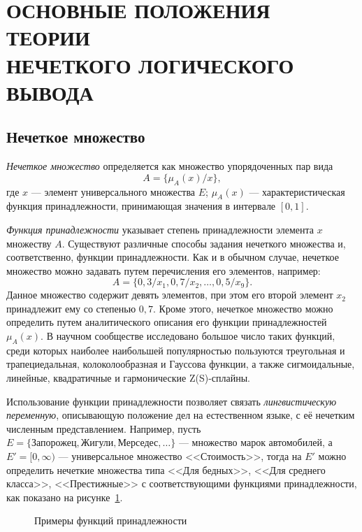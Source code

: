 \section[Основные положения теории нечеткого логического вывода]{%
  ОСНОВНЫЕ ПОЛОЖЕНИЯ ТЕОРИИ \\
  НЕЧЕТКОГО ЛОГИЧЕСКОГО ВЫВОДА
}

\subsection{Нечеткое множество}

\emph{Нечеткое множество} определяется как множество упорядоченных пар вида
\[
A = \{ \mu_A(x) / x \},
\]
где
\( x \) --- элемент универсального множества \( E \);
\( \mu_A(x) \) --- характеристическая функция принадлежности,
принимающая значения в интервале \( [0, 1] \).

\emph{Функция принадлежности} указывает степень принадлежности
элемента \( x \) множеству \( A \).
Существуют различные способы задания нечеткого множества и,
соответственно, функции принадлежности. Как и в обычном случае,
нечеткое множество можно задавать путем перечисления его элементов, например:
\[
  A = \{ 0{,}3/x_1, 0{,}7/x_2, \ldots, 0{,}5/x_9 \}.
\]
Данное множество содержит девять элементов, при этом его второй элемент \( x_2 \)
принадлежит ему со степенью \( 0{,}7 \).
Кроме этого, нечеткое множество можно определить путем аналитического описания его
функции принадлежностей \( \mu_A(x) \).
В научном сообществе исследовано большое число таких функций,
среди которых наиболее наибольшей популярностью пользуются
треугольная и трапециедальная, колоколообразная и Гауссова функции,
а также сигмоидальные, линейные,
квадратичные и гармонические Z(S)-сплайны\cite{fuzzy_bstu_22}.

Использование функции принадлежности позволяет связать
\emph{лингвистическую переменную}, описывающую положение дел на естественном языке,
с её нечетким численным представлением.
Например, пусть
\( E = \{ \text{Запорожец}, \text{Жигули}, \text{Мерседес}, \ldots \} \) ---
множество марок автомобилей, а
\( E' = [0, \infty) \) --- универсальное множество <<Стоимость>>,
тогда на \( E' \) можно определить нечеткие множества типа
<<Для бедных>>, <<Для среднего класса>>, <<Престижные>> с
соответствующими функциями принадлежности,
как показано на рисунке~\ref{fig:example_functions}.

\begin{figure}[h!]
  \centering
  \caption{Примеры функций принадлежности}
  \label{fig:example_functions}
\end{figure}

